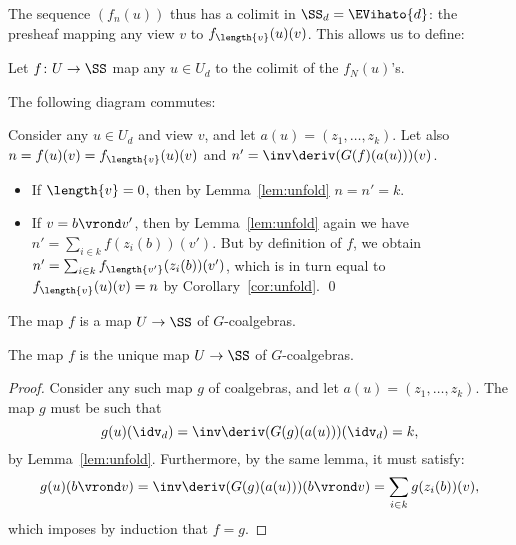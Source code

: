 \documentclass{LMCS}
\theoremstyle{plain}\newtheorem{satz}[thm]{Satz}
\begin{document}
  The sequence $(f_n(u))$ thus has a colimit in $\SS_d = \EVihato{d}$:
  the presheaf mapping any view $v$ to $f_{\length{v}} (u)(v)$. This
  allows us to define:
\begin{defi}
  Let $f \colon U \to \SS$ map any $u \in U_d$ to the colimit of
  the $f_N (u)$'s.
\end{defi}

\begin{lem}
  The following diagram commutes:
  \begin{center}
  \end{center}
\end{lem}
\proof Consider any $u \in U_d$ and view $v$, and let $a(u) = (z_1,
\ldots, z_k)$.  Let also $n = f(u)(v) = f_{\length{v}} (u) (v)$ and
$n' = \inv\deriv (G(f)(a(u)))(v)$.
  \begin{itemize}
  \item If $\length{v} = 0$, then by Lemma~\ref{lem:unfold} $n = n' =
    k$.
  \item If $v = b \vrond v'$, then by Lemma~\ref{lem:unfold} again we
    have $n' = \sum_{i \in k} f (z_i (b)) (v')$. But by definition of
    $f$, we obtain $n' = \sum_{i \in k} f_{\length{v'}} (z_i (b))
    (v')$, which is in turn equal to $f_{\length{v}} (u) (v) = n$ by
    Corollary~\ref{cor:unfold}. \qed
  \end{itemize}

\begin{cor}
  The map $f$ is a map $U \to \SS$ of $G $-coalgebras.
\end{cor}


\begin{lem}
  The map $f$ is the unique map $U \to \SS$ of $G $-coalgebras.
\end{lem}
\begin{proof}
  Consider any such map $g$ of coalgebras, and let $a(u) = (z_1,\ldots,z_k)$. The map $g$ must be such that 
  $$g (u) (\idv_{d}) = \inv\deriv (G (g) (a (u))) (\idv_d) = k,$$ by
  Lemma~\ref{lem:unfold}.
  Furthermore, by the same lemma, it must satisfy:
  $$g (u) (b \vrond v) = \inv\deriv (G (g) (a (u))) (b \vrond v) = \sum_{i \in k}
  g (z_i (b)) (v),$$ which imposes by induction that $f = g$.
\end{proof}
\end{document}
